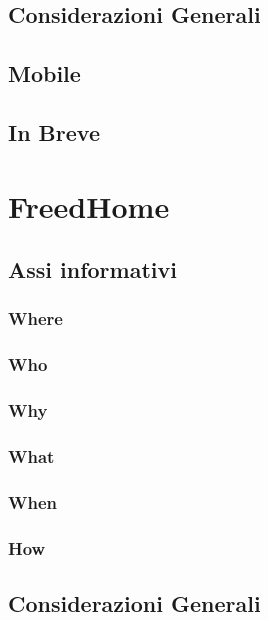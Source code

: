 \documentclass[a4paper, oneside, openany, dvipsnames, table]{article}
\begin{document}
	\subsection{Considerazioni Generali}
			
	\subsection{Mobile}
		\label{sez:DualHome_Mobile}
		
	\subsection{In Breve}
		

\newpage
\section{FreedHome}
	\subsection{Assi informativi}
		\subsubsection{Where}
			
		\subsubsection{Who}
			
		\subsubsection{Why}
			
		\subsubsection{What}
			
		\subsubsection{When}
			
		\subsubsection{How}
			
	\subsection{Considerazioni Generali}
				
\end{document}
